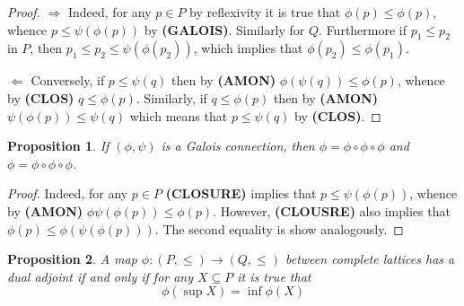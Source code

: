 \documentclass[a4paper]{article}
\newcommand{\brac}[1]{{\left ( #1 \right )}}
\newtheorem{prop}{Proposition}
\begin{document}
\begin{proof}
$\Rightarrow$ Indeed, for any $p\in P$ by reflexivity it is true that $\phi(p)\leq \phi(p)$, whence $p\leq \psi\brac{\phi(p)}$ by \textbf{(GALOIS)}. Similarly for $Q$. Furthermore if $p_1\leq p_2$ in $P$, then $p_1\leq p_2\leq \psi\brac{\phi(p_2)}$, which implies that $\phi(p_2)\leq \phi(p_1)$.

$\Leftarrow$ Conversely, if $p\leq \psi(q)$ then by \textbf{(AMON)} $\phi\brac{\psi(q)}\leq \phi(p)$, whence by \textbf{(CLOS)} $q\leq \phi(p)$. Similarly, if $q\leq \phi(p)$ then by \textbf{(AMON)} $\psi\brac{\phi(p)}\leq \psi(q)$ which means that $p\leq \psi(q)$ by \textbf{(CLOS)}.
\end{proof}

\begin{prop} If $(\phi,\psi)$ is a Galois connection, then $\phi = \phi\circ \phi\circ \phi$ and $\phi = \phi\circ \phi\circ \phi$.
\end{prop}

\begin{proof}
Indeed, for any $p\in P$ \textbf{(CLOSURE)} implies that $p\leq \psi\brac{\phi(p)}$, whence by \textbf{(AMON)} $\phi{\psi\brac{\phi(p)}}\leq \phi(p)$. However, \textbf{(CLOUSRE)} also implies that $\phi(p)\leq \phi\brac{\psi\brac{\phi(p)}}$. The second equality is show analogously.
\end{proof}

\begin{prop} A map $\phi:(P,\leq)\to (Q,\leq)$ between complete lattices has a dual adjoint if and only if for any $X\subseteq P$ it is true that \[\phi\brac{\sup X} = \inf \phi(X)\]
\end{prop}
\end{document}
